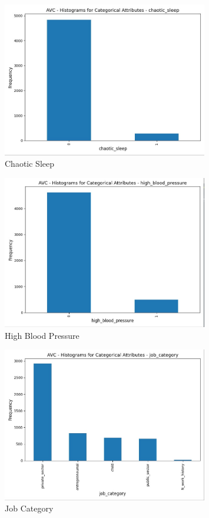 \documentclass[a4paper,12pt]{article}
\begin{document}
\begin{figure}[H]
    \centering
    \includegraphics[width=0.8\textwidth]{Resources/histogram_chaotic_sleep.jpeg}
    \caption{Chaotic Sleep}
\end{figure}

\begin{figure}[H]
    \centering
    \includegraphics[width=0.8\textwidth]{Resources/histogram_high_blood_pressure.jpeg}
    \caption{High Blood Pressure}
\end{figure}

\begin{figure}[H]
    \centering
    \includegraphics[width=0.8\textwidth]{Resources/histogram_job_cat.jpeg}
    \caption{Job Category}
\end{figure}
\end{document}
